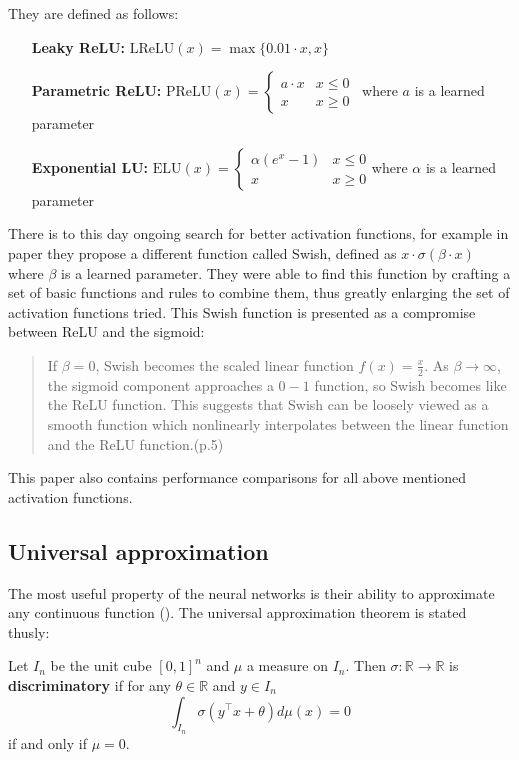 They are defined as follows:
\begin{itemize}
\item[\textbf{Leaky ReLU:}] $\text{LReLU}(x)=\max\{0.01\cdot x,x\}$
\item[\textbf{Parametric ReLU:}] $\text{PReLU}(x)=
\begin{cases} 
      a\cdot x & x\leq 0 \\
      x & x\geq 0
   \end{cases}$\ where $a$ is a learned parameter
\item[\textbf{Exponential LU:}] $\text{ELU}(x)=
\begin{cases} 
      \alpha(e^x-1) & x\leq 0 \\
      x & x\geq 0
   \end{cases}
$where $\alpha$ is a learned parameter
\end{itemize}

There is to this day ongoing search for better activation functions, for example in paper \cite{swish} they propose a different function called Swish, defined as $x\cdot \sigma(\beta\cdot x)$ where $\beta$ is a learned parameter. They were able to find this function by crafting a set of basic functions and rules to combine them, thus greatly enlarging the set of activation functions tried. This Swish function is presented as a compromise between ReLU and the sigmoid:
\begin{quote}
If $\beta=0$, Swish becomes the scaled linear function $f(x)=\frac{x}{2}$. As $\beta\rightarrow\infty$,  the sigmoid component approaches a $0-1$ function,  so Swish becomes like the ReLU function. This suggests that Swish can be loosely viewed as a smooth function which nonlinearly interpolates between the linear function and the ReLU function.(p.5)
\end{quote}

This paper also contains performance comparisons for all above mentioned activation functions.

\subsection{Universal approximation}

The most useful property of the neural networks is their ability to approximate any continuous function (\cite{universal}). The universal approximation theorem is stated thusly:

\begin{defn}
 Let $I_n$ be the unit cube $[0,1]^n$ and $\mu$ a measure on $I_n$. Then $\sigma:\mathbb{R}\rightarrow\mathbb{R}$ is \textbf{discriminatory} if for any $\theta\in\mathbb{R}$ and $y\in I_n$ $$\int_{I_n}\sigma(y^\top x+\theta)d\mu(x)=0$$ if and only if $\mu=0$.
\end{defn}

